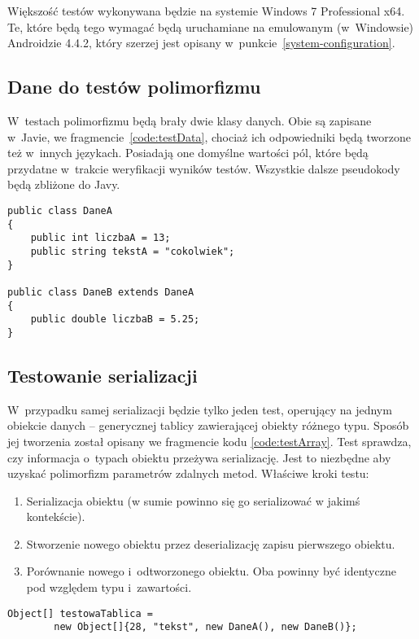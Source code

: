 Większość testów wykonywana będzie na systemie Windows 7 Professional x64.
Te, które będą tego wymagać będą uruchamiane na emulowanym (w~Windowsie) Androidzie 4.4.2, który szerzej jest opisany w~punkcie~\ref{system-configuration}.


\subsection{Dane do testów polimorfizmu}
W~testach polimorfizmu będą brały dwie klasy danych. Obie są zapisane w~Javie, we fragmencie~\ref{code:testData}, chociaż ich odpowiedniki będą tworzone też w~innych językach. Posiadają one domyślne wartości pól, które będą przydatne w~trakcie weryfikacji wyników testów. Wszystkie dalsze pseudokody będą zbliżone do Javy.

\begin{lstlisting}[float, frame=single, caption={Testowe klasy danych; jedna dziedzicząca drugą.}, label=code:testData]
public class DaneA
{
	public int liczbaA = 13;
	public string tekstA = "cokolwiek";
}

public class DaneB extends DaneA
{
	public double liczbaB = 5.25;
}
\end{lstlisting}


\subsection{Testowanie serializacji}
W~przypadku samej serializacji będzie tylko jeden test, operujący na jednym obiekcie danych -- generycznej tablicy zawierającej obiekty różnego typu.
Sposób jej tworzenia został opisany we fragmencie kodu \ref{code:testArray}.
Test sprawdza, czy informacja o~typach obiektu przeżywa serializację.
Jest to niezbędne aby uzyskać polimorfizm parametrów zdalnych metod.
Właściwe kroki testu:
\begin{enumerate}
	\item Serializacja obiektu (w sumie powinno się go serializować w jakimś kontekście).
	\item Stworzenie nowego obiektu przez deserializację zapisu pierwszego obiektu.
	\item Porównanie nowego i~odtworzonego obiektu. Oba powinny być identyczne pod względem typu i~zawartości.
\end{enumerate}

\begin{lstlisting}[frame=single, caption={Tablica obiektów różnych typów służąca do sprawdzenia, czy informacja o~typie zostaje zachowana.}, label=code:testArray]
Object[] testowaTablica =
		new Object[]{28, "tekst", new DaneA(), new DaneB()};
\end{lstlisting}

